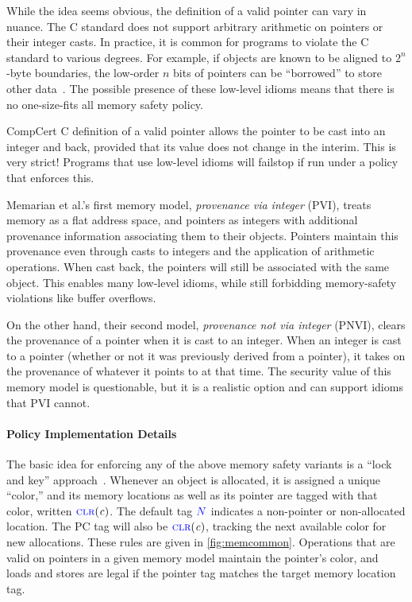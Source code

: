\documentclass{llncs}
\begin{document}
While the idea seems obvious, the definition of a valid pointer can vary in nuance. The C standard
does not support arbitrary arithmetic on pointers or their integer casts.  In practice, it is common for programs to violate the
C standard to various degrees. For example, if objects are known to be aligned to \(2^n\)-byte boundaries,
the low-order \(n\) bits of pointers can be ``borrowed'' to store other data~\cite{Memarian16:DeFacto}.
The possible presence of these low-level idioms means that there is no one-size-fits all memory safety policy.

CompCert C definition of a valid pointer allows the pointer to be cast into an integer and back, provided that its value
does not change in the interim. This is very strict! Programs that use low-level idioms
will failstop if run under a policy that enforces this.

Memarian et al.'s first memory model, {\em provenance via integer} (PVI), treats memory
as a flat address space, and pointers as integers with additional provenance information
associating them to their objects. Pointers maintain this provenance even through casts to
integers and the application of arithmetic operations. When cast back, the pointers will still
be associated with the same object. This enables many low-level idioms, while still forbidding
memory-safety violations like buffer overflows.

On the other hand, their second model, {\em provenance not via integer} (PNVI), clears the
provenance of a pointer when it is cast to an integer. When an integer is cast to a pointer
(whether or not it was previously derived from a pointer), it takes on the provenance of whatever
it points to at that time. The security value of this memory model is questionable, but
it is a realistic option and can support idioms that PVI cannot.

\paragraph*{Policy Implementation Details}

The basic idea for enforcing any of the above memory safety variants is a ``lock and key'' approach~\cite{Clause07:MemsafeTainting,Azevedo+15}.
Whenever an object is allocated, it is assigned a unique ``color,'' and its memory locations as well
as its pointer are tagged with that color, written \(\textnormal{\color{blue} \sc clr}(\mathit{c})\).
The default tag \({\color{blue} N}\) indicates a non-pointer or non-allocated location.
The PC tag will also be \(\textnormal{\color{blue} \sc clr}(\mathit{c})\),
tracking the next available color for new allocations. These rules are given in \cref{fig:memcommon}.
Operations that are valid on pointers in a given memory model
maintain the pointer's color, and loads and stores are legal if the pointer tag matches the target memory
location tag.
\end{document}
